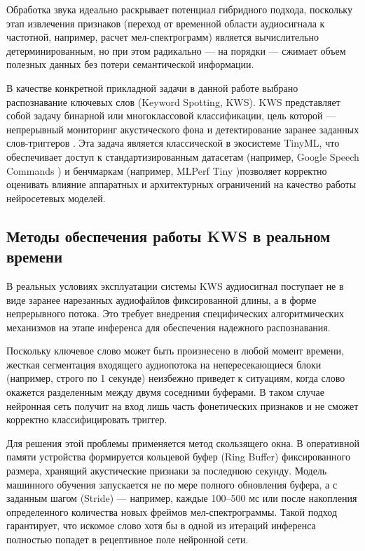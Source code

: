 Обработка звука идеально раскрывает потенциал гибридного подхода, поскольку этап извлечения признаков (переход от временной области аудиосигнала к частотной, например, расчет мел-спектрограмм) является вычислительно детерминированным, но при этом радикально — на порядки — сжимает объем полезных данных без потери семантической информации.

В качестве конкретной прикладной задачи в данной работе выбрано распознавание ключевых слов (Keyword Spotting, KWS). KWS представляет собой задачу бинарной или многоклассовой классификации, цель которой — непрерывный мониторинг акустического фона и детектирование заранее заданных слов-триггеров \cite{López-Espejo}. Эта задача является классической в экосистеме TinyML, что обеспечивает доступ к стандартизированным датасетам (например, Google Speech Commands \cite{speech_commands_dataset_tfds}) и бенчмаркам (например, MLPerf Tiny \cite{mlperf_tiny_v1_3})позволяет корректно оценивать влияние аппаратных и архитектурных ограничений на качество работы нейросетевых моделей.

\subsection{Методы обеспечения работы KWS в реальном времени}
В реальных условиях эксплуатации системы KWS аудиосигнал поступает не в виде заранее нарезанных аудиофайлов фиксированной длины, а в форме непрерывного потока. Это требует внедрения специфических алгоритмических механизмов на этапе инференса для обеспечения надежного распознавания.\cite{López-Espejo}

Поскольку ключевое слово может быть произнесено в любой момент времени, жесткая сегментация входящего аудиопотока на непересекающиеся блоки (например, строго по 1 секунде) неизбежно приведет к ситуациям, когда слово окажется разделенным между двумя соседними буферами. В таком случае нейронная сеть получит на вход лишь часть фонетических признаков и не сможет корректно классифицировать триггер. 

Для решения этой проблемы применяется метод скользящего окна. В оперативной памяти устройства формируется кольцевой буфер (Ring Buffer) фиксированного размера, хранящий акустические признаки за последнюю секунду. Модель машинного обучения запускается не по мере полного обновления буфера, а с заданным шагом (Stride) — например, каждые 100–500 мс или после накопления определенного количества новых фреймов мел-спектрограммы. Такой подход гарантирует, что искомое слово хотя бы в одной из итераций инференса полностью попадет в рецептивное поле нейронной сети.\cite{López-Espejo}

